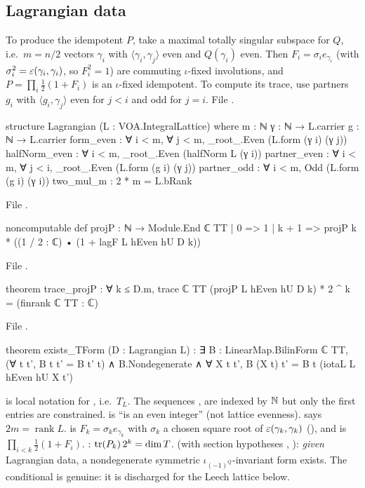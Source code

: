 \subsection{Lagrangian data}

To produce the idempotent $P$, take a maximal totally singular subspace for $Q$, i.e.\ $m=n/2$
vectors $\gamma_i$ with $\langle\gamma_i,\gamma_j\rangle$ even and $Q(\gamma_i)$ even.  Then
$F_i=\sigma_ie_{\gamma_i}$ (with $\sigma_i^2=\varepsilon(\gamma_i,\gamma_i)$, so $F_i^2=1$) are
commuting $\iota$-fixed involutions, and $P=\prod_i\frac12(1+F_i)$ is an $\iota$-fixed idempotent.
To compute its trace, use partners $g_i$ with $\langle g_i,\gamma_j\rangle$ even for $j<i$ and odd
for $j=i$.
\noindent File .
\begin{leancode}
structure Lagrangian (L : VOA.IntegralLattice) where
  m : ℕ
  γ : ℕ → L.carrier
  g : ℕ → L.carrier
  form_even : ∀ i < m, ∀ j < m, _root_.Even (L.form (γ i) (γ j))
  halfNorm_even : ∀ i < m, _root_.Even (halfNorm L (γ i))
  partner_even : ∀ i < m, ∀ j < i, _root_.Even (L.form (g i) (γ j))
  partner_odd : ∀ i < m, Odd (L.form (g i) (γ i))
  two_mul_m : 2 * m = L.bRank
\end{leancode}
\noindent File .
\begin{leancode}
noncomputable def projP : ℕ → Module.End ℂ TT
  | 0 => 1
  | k + 1 => projP k * ((1 / 2 : ℂ) • (1 + lagF L hEven hU D k))
\end{leancode}
\noindent File .
\begin{leancode}
theorem trace_projP : ∀ k ≤ D.m,
    trace ℂ TT (projP L hEven hU D k) * 2 ^ k = (finrank ℂ TT : ℂ)
\end{leancode}
\noindent File .
\begin{leancode}
theorem exists_TForm (D : Lagrangian L) :
    ∃ B : LinearMap.BilinForm ℂ TT, (∀ t t', B t t' = B t' t) ∧ B.Nondegenerate ∧
      ∀ X t t', B (X t) t' = B t (iotaL L hEven hU X t')
\end{leancode}
\begin{dictionary}
 is local notation for , i.e.\ $T_L$.
The sequences ,  are indexed by ${\mathbb{N}}$ but only the first  entries are
constrained.   is ``is an even integer'' (not lattice evenness).
 says $2m=\operatorname{rank}L$.   is $F_k=\sigma_ke_{\gamma_k}$
with $\sigma_k$ a chosen square root of $\varepsilon(\gamma_k,\gamma_k)$ (), and
 is $\prod_{i<k}\frac12(1+F_i)$.  : $\operatorname{tr}(P_k)\,2^k=\dim T$.
 (with section hypotheses , ): \emph{given} Lagrangian data,
a nondegenerate symmetric $\iota_{(-1)^Q}$-invariant form exists.  The conditional is genuine: it is
discharged for the Leech lattice below.
\end{dictionary}

